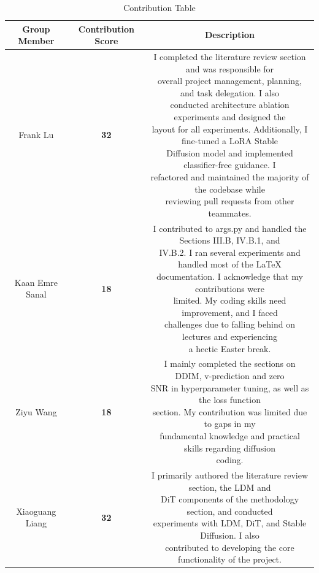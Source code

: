 \documentclass[conference]{IEEEtran}
\begin{document}
\begin{table}[H]
    \centering
    \caption{Contribution Table}
    \label{tab:conditioning_table}
    \begin{tabular}{|c|c|c|}  
    \hline
        \textbf{Group Member} & \textbf{Contribution Score} & \textbf{Description}\\
        \hline
        \hline
        Frank Lu & \textbf{32} & \makecell{I completed the literature review section and was responsible for\\overall project management, planning, and task delegation. I also\\conducted architecture ablation experiments and designed the\\layout for all experiments. Additionally, I fine-tuned a LoRA Stable\\Diffusion model and implemented classifier-free guidance. I\\refactored and maintained the majority of the codebase while\\reviewing pull requests from other teammates. } \\ \hline
        Kaan Emre Sanal & \textbf{18} & \makecell{I contributed to args.py and handled the Sections III.B, IV.B.1, and\\IV.B.2. I ran several experiments and handled most of the LaTeX\\documentation. I acknowledge that my contributions were\\limited. My coding skills need improvement, and I faced\\challenges due to falling behind on lectures and experiencing\\a hectic Easter break.} \\ \hline
        Ziyu Wang & \textbf{18} & \makecell{I mainly completed the sections on DDIM, v-prediction and zero\\SNR in hyperparameter tuning, as well as the loss function\\section. My contribution was limited due to gaps in my\\fundamental knowledge and practical skills regarding diffusion\\coding. } \\ \hline
        Xiaoguang Liang & \textbf{32} & \makecell{I primarily authored the literature review section, the LDM and\\DiT components of the methodology section, and conducted\\experiments with LDM, DiT, and Stable Diffusion. I also\\contributed to developing the core functionality of the project.} \\
        \hline
    \end{tabular}
\end{table}
\end{document}
